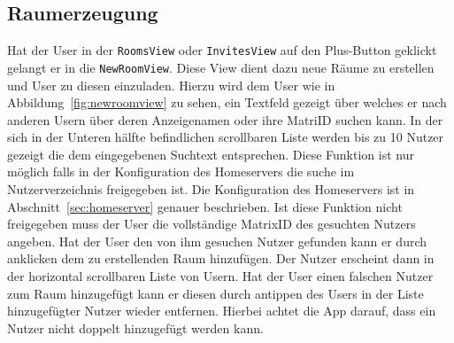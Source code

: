     \newpage
    \subsection{Raumerzeugung}\label{subsec:raumerzeugung}
    Hat der User in der \texttt{RoomsView} oder \texttt{InvitesView} auf den Plus-Button geklickt gelangt er in die \texttt{NewRoomView}.
    Diese View dient dazu neue Räume zu erstellen und User zu diesen einzuladen.
    Hierzu wird dem User wie in Abbildung~\ref{fig:newroomview} zu sehen, ein Textfeld gezeigt über welches er nach anderen Usern über deren Anzeigenamen oder ihre MatriID suchen kann.
    In der sich in der Unteren hälfte befindlichen scrollbaren Liste werden bis zu 10 Nutzer gezeigt die dem eingegebenen Suchtext entsprechen.
    Diese Funktion ist nur möglich falls in der Konfiguration des Homeservers die suche im Nutzerverzeichnis freigegeben ist.
    Die Konfiguration des Homeservers ist in Abschnitt~\ref{sec:homeserver} genauer beschrieben.
    Ist diese Funktion nicht freigegeben muss der User die vollständige MatrixID des gesuchten Nutzers angeben.
    Hat der User den von ihm gesuchen Nutzer gefunden kann er durch anklicken dem zu erstellenden Raum hinzufügen.
    Der Nutzer erscheint dann in der horizontal scrollbaren Liste von Usern.
    Hat der User einen falschen Nutzer zum Raum hinzugefügt kann er diesen durch antippen des Users in der Liste hinzugefügter Nutzer wieder entfernen.
    Hierbei achtet die App darauf, dass ein Nutzer nicht doppelt hinzugefügt werden kann.

